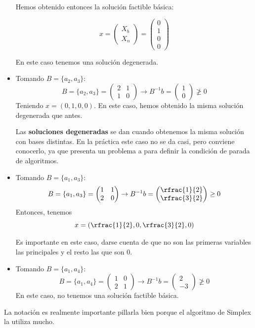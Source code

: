 \begin{example}
\begin{itemize}
		Hemos obtenido entonces la solución factible básica:

		\[x = \begin{pmatrix}X_b\\\hline X_n\end{pmatrix} = \begin{pmatrix}0\\1\\\hline0\\0\end{pmatrix}\]

		En este caso tenemos una solución degenerada.

	\item Tomando $B = \{a_2,a_3\}$:
		\[B = \{a_2,a_3\} = \begin{pmatrix}2&1\\1&0\end{pmatrix} \to B^{-1}b = \begin{pmatrix}1\\0\end{pmatrix} \not\geq 0\]
	 	Teniendo $x = (0,1,0,0)$. En este caso, hemos obtenido la misma solución degenerada que antes.

	 	Las \textbf{soluciones degeneradas} se dan cuando obtenemos la misma solución con bases distintas. En la práctica este caso no se da casi, pero conviene conocerlo, ya que presenta un problema a para definir la condición de parada de algoritmos.


	\item Tomando $B = \{a_1,a_3\}$:
		\[B = \{a_1,a_3\} = \begin{pmatrix}1&1\\2&0\end{pmatrix} \to B^{-1}b = \begin{pmatrix}\rfrac{1}{2}\\\rfrac{3}{2}\end{pmatrix} \geq 0\]
		Entonces, tenemos \[x = (\rfrac{1}{2},0,\rfrac{3}{2},0)\]

		Es importante en este caso, darse cuenta de que no son las primeras variables las principales y el resto las que son 0.
	\item Tomando $B = \{a_1,a_4\}$:
		\[B = \{a_1,a_4\} = \begin{pmatrix}1&0\\2&1\end{pmatrix} \to B^{-1}b = \begin{pmatrix}2\\-3\end{pmatrix} \not\geq 0\]
		En este caso, no tenemos una solución factible básica.

\end{itemize}

\obs La notación es realmente importante pillarla bien porque el algoritmo de Simplex la utiliza mucho.

\end{example}

